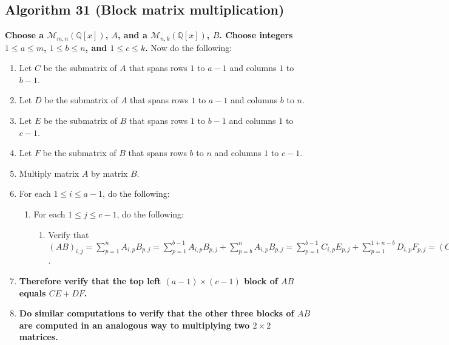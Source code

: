 \documentclass[twocolumn]{article}
\begin{document}
		\subsection{Algorithm 31 (Block matrix multiplication)}\label{sec:algorithm 31}
			\textbf{Choose a $\mathcal{M}_{m,n}(\mathbb{Q}[x])$, $A$, and a $\mathcal{M}_{n,k}(\mathbb{Q}[x])$, $B$. Choose integers $1\le a\le m$, $1\le b\le n$, and $1\le c\le k$.} Now do the following:
			\begin{enumerate}
				\item Let $C$ be the submatrix of $A$ that spans rows $1$ to $a-1$ and columns $1$ to $b-1$.
				\item Let $D$ be the submatrix of $A$ that spans rows $1$ to $a-1$ and columns $b$ to $n$.
				\item Let $E$ be the submatrix of $B$ that spans rows $1$ to $b-1$ and columns $1$ to $c-1$.
				\item Let $F$ be the submatrix of $B$ that spans rows $b$ to $n$ and columns $1$ to $c-1$.
				\item Multiply matrix $A$ by matrix $B$.
				\item For each $1\le i\le a-1$, do the following:
				\begin{enumerate}
					\item For each $1\le j\le c-1$, do the following:
						\begin{enumerate}
							\item Verify that $(AB)_{i,j}=\sum_{p=1}^n A_{i,p}B_{p,j}=\sum_{p=1}^{b-1} A_{i,p}B_{p,j}+\sum_{p=b}^n A_{i,p}B_{p,j}=\sum_{p=1}^{b-1} C_{i,p}E_{p,j}+\sum_{p=1}^{1+n-b} D_{i,p}F_{p,j}=(CE)_{i,j}+(DF)_{i,j}$.
						\end{enumerate}
				\end{enumerate}
				\item \textbf{Therefore verify that the top left $(a-1)\times(c-1)$ block of $AB$ equals $CE+DF$.}
				\item \textbf{Do similar computations to verify that the other three blocks of $AB$ are computed in an analogous way to multiplying two $2\times 2$ matrices.}
			\end{enumerate}
\end{document}
